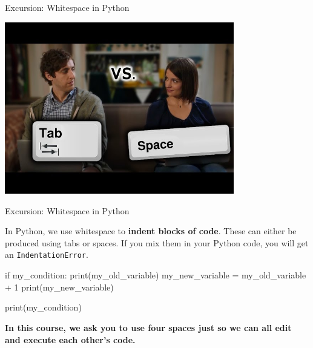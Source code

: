 \begin{frame}[fragile]{Excursion: Whitespace in Python}
	
    \centering \includegraphics[width=0.75\textwidth]{05_Strings/tabs_vs_spaces.jpg}


\end{frame}

\begin{frame}[fragile]{Excursion: Whitespace in Python}
	
    In Python, we use whitespace to \textbf{indent blocks of code}. 
    These can either be produced using tabs or spaces.
    If you mix them in your Python code, you will get an \texttt{IndentationError}.
    
    
    \begin{pythoncode}

if my_condition:
    print(my_old_variable)
    my_new_variable = my_old_variable + 1
    print(my_new_variable)

print(my_condition)

    \end{pythoncode}

    \textbf{In this course, we ask you to use four spaces just so we can all edit and execute each other's code.}


\end{frame}


